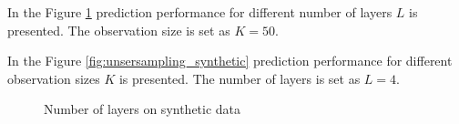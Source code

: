 \documentclass[letterpaper]{article}
\begin{document}
In the Figure \ref{fig:number_of_layers_synthetic} prediction performance for different number of layers $L$ is presented. The observation size is set as $K=50$. 

In the Figure \ref{fig:unsersampling_synthetic} prediction performance for different observation sizes $K$ is presented. The number of layers is set as $L=4$.

\begin{figure}[t]
\newline
\caption{Number of layers on synthetic data}
\label{fig:number_of_layers_synthetic}
\end{figure}
\end{document}
